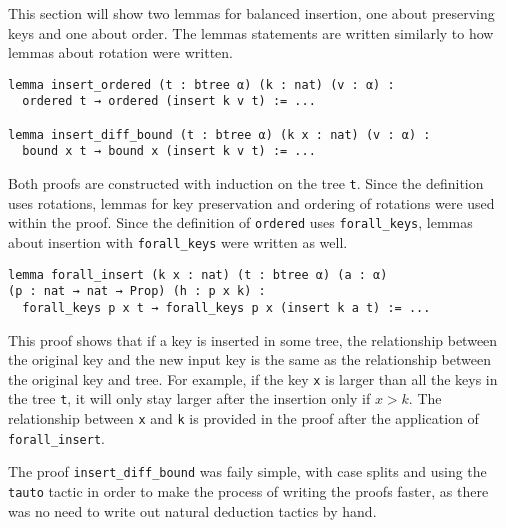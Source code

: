 This section will show two lemmas for balanced insertion, one about preserving keys and one about order. The lemmas statements are written similarly to how lemmas about rotation were written.

\begin{lstlisting}
lemma insert_ordered (t : btree α) (k : nat) (v : α) :
  ordered t → ordered (insert k v t) := ...

lemma insert_diff_bound (t : btree α) (k x : nat) (v : α) :
  bound x t → bound x (insert k v t) := ...
\end{lstlisting}

Both proofs are constructed with induction on the tree \lstinline{t}. Since the definition uses rotations, lemmas for key preservation and ordering of rotations were used within the proof. Since the definition of \lstinline{ordered} uses \lstinline{forall_keys}, lemmas about insertion with \lstinline{forall_keys} were written as well.

\begin{lstlisting}
lemma forall_insert (k x : nat) (t : btree α) (a : α) 
(p : nat → nat → Prop) (h : p x k) :
  forall_keys p x t → forall_keys p x (insert k a t) := ...
\end{lstlisting}

This proof shows that if a key is inserted in some tree, the relationship between the original key and the new input key is the same as the relationship between the original key and tree. For example, if the key \lstinline{x} is larger than all the keys in the tree \lstinline{t}, it will only stay larger after the insertion only if $x > k$. The relationship between \lstinline{x} and \lstinline{k} is provided in the proof after the application of \lstinline{forall_insert}.

The proof \lstinline{insert_diff_bound} was faily simple, with case splits and using the \lstinline{tauto} tactic in order to make the process of writing the proofs faster, as there was no need to write out natural deduction tactics by hand.